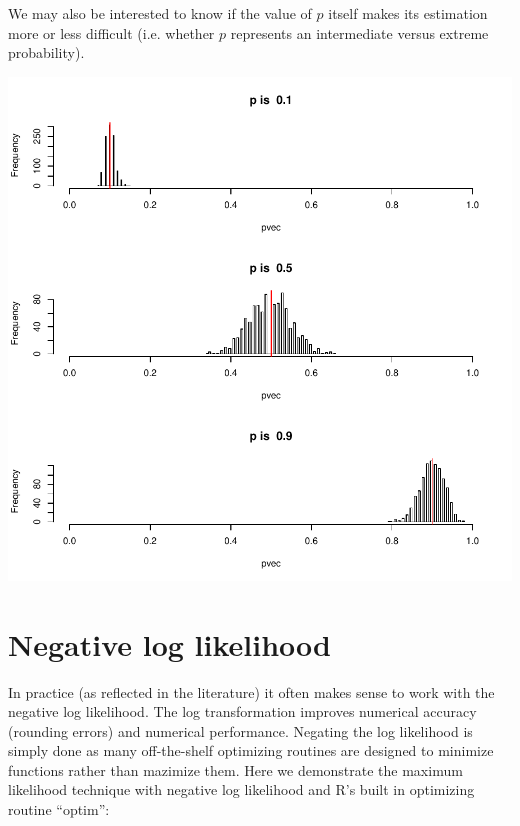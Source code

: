 \documentclass{article}
\begin{document}
We may also be interested to know if the value of $p$ itself makes its estimation more or less difficult (i.e. whether $p$ represents an intermediate versus extreme probability).

\includegraphics{chn_binom-012}

\section*{Negative log likelihood}
In practice (as reflected in the literature) it often makes sense to work with the negative log likelihood. The log transformation improves numerical accuracy (rounding errors) and numerical performance. Negating the log likelihood is simply done as many off-the-shelf optimizing routines are designed to minimize functions rather than mazimize them. Here we demonstrate the maximum likelihood technique with negative log likelihood and R's built in optimizing routine ``optim'':
\end{document}
